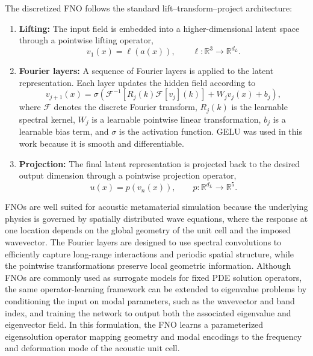 \documentclass[preprint,review,12pt]{elsarticle}
\begin{document}
The discretized FNO follows the standard lift--transform--project architecture:
\begin{enumerate}
\item \textbf{Lifting:} The input field is embedded into a higher-dimensional latent space through a pointwise lifting operator,
\begin{equation}
v_1(x)=\ell(a(x)),
\qquad
\ell:\mathbb{R}^{3}\rightarrow\mathbb{R}^{d_L}.
\end{equation}

\item \textbf{Fourier layers:} A sequence of Fourier layers is applied to the latent representation. Each layer updates the hidden field according to
\begin{equation}
v_{j+1}(x)
=
\sigma\left(
\mathcal{F}^{-1}
\left[
R_j(k)\mathcal{F}[v_j](k)
\right]
+
W_jv_j(x)
+
b_j
\right),
\end{equation}
where $\mathcal{F}$ denotes the discrete Fourier transform, $R_j(k)$ is the learnable spectral kernel, $W_j$ is a learnable pointwise linear transformation, $b_j$ is a learnable bias term, and $\sigma$ is the activation function. GELU was used in this work because it is smooth and differentiable.

\item \textbf{Projection:} The final latent representation is projected back to the desired output dimension through a pointwise projection operator,
\begin{equation}
u(x)=p(v_n(x)),
\qquad
p:\mathbb{R}^{d_L}\rightarrow\mathbb{R}^{5}.
\end{equation}
\end{enumerate}

FNOs are well suited for acoustic metamaterial simulation because the underlying physics is governed by spatially distributed wave equations, where the response at one location depends on the global geometry of the unit cell and the imposed wavevector. The Fourier layers are designed to use spectral convolutions to efficiently capture long-range interactions and periodic spatial structure, while the pointwise transformations preserve local geometric information. Although FNOs are commonly used as surrogate models for fixed PDE solution operators, the same operator-learning framework can be extended to eigenvalue problems by conditioning the input on modal parameters, such as the wavevector and band index, and training the network to output both the associated eigenvalue and eigenvector field. In this formulation, the FNO learns a parameterized eigensolution operator mapping geometry and modal encodings to the frequency and deformation mode of the acoustic unit cell.
\end{document}
